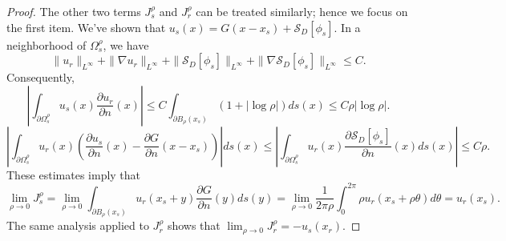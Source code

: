 \begin{proof}
The other two terms $J^\rho_s$ and $J^\rho_r$ can be treated
similarly; hence we focus on the first item. We've shown that
$u_s(x) = G(x-x_s) + \mathcal{S}_D[\phi_s]$. In a
neighborhood of $\Omega^\rho_s$,  we have
\begin{equation*}
\|u_r\|_{L^\infty} + \|\nabla u_r\|_{L^\infty} + \|\mathcal{S}_D
[\phi_s]\|_{L^\infty} + \|\nabla \mathcal{S}_D [\phi_s]
\|_{L^\infty} \le C.
\end{equation*}
Consequently,
\begin{equation*}
\left| \int_{\partial \Omega^\rho_s} u_s(x) \frac{\partial
u_r}{\partial n} (x) \right| \le C\int_{\partial B_\rho(x_s)} (1+
|\log \rho|) ds(x) \le C\rho |\log \rho|.
\end{equation*}
\begin{equation*}
\left| \int_{\partial \Omega^\rho_s} u_r(x) \left(\frac{\partial
u_s }{\partial n} (x) - \frac{\partial G }{\partial n} (x -
x_s) \right) \right| ds(x) \le \left| \int_{\partial
\Omega^\rho_s} u_r(x) \frac{\partial \mathcal{S}_D
[\phi_s]}{\partial n} (x) ds(x)\right| \le  C\rho.
\end{equation*}
These estimates imply that
\begin{equation*}
\lim_{\rho \to 0} J^\rho_s = \lim_{\rho \to 0} \int_{\partial
B_\rho(x_s)} u_r(x_s + y) \frac{\partial G}{\partial n} (y)
ds(y) = \lim_{\rho \to 0} \frac{1}{2\pi \rho} \int_0^{2\pi} \rho
u_r(x_s + \rho \theta) d\theta = u_r(x_s).
\end{equation*}
The same analysis applied to $J^\rho_r$ shows that $\lim_{\rho \to
0} J^\rho_r = -u_s(x_r)$.


\end{proof}
